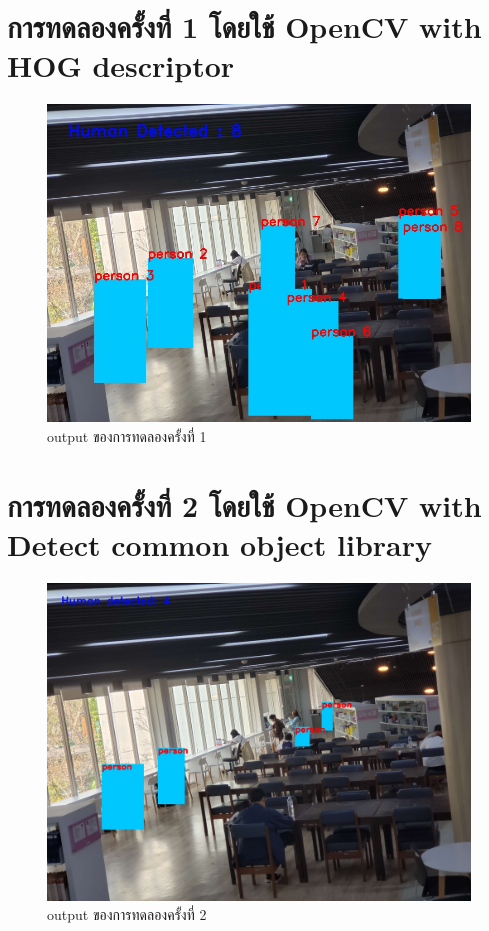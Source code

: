 \section{การทดลองครั้งที่ 1 โดยใช้ OpenCV with HOG descriptor}
\begin{figure}[h]
    \centering
    \includegraphics[scale=0.35]{images/hog_output.jpg}
    \caption[output]{output ของการทดลองครั้งที่ 1}
    \label{fig:output1}
\end{figure}

\section{การทดลองครั้งที่ 2 โดยใช้ OpenCV with Detect common object library}
\begin{figure}[h]
    \centering
    \includegraphics[scale=0.25]{images/cvlib_output.jpg}
    \caption[output]{output ของการทดลองครั้งที่ 2}
    \label{fig:output2}
\end{figure}

